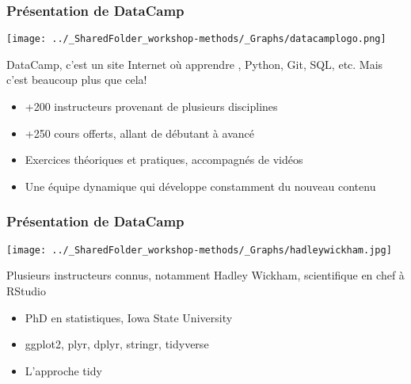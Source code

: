 \documentclass{beamer}
\begin{document}
    \begin{frame}
    
      \frametitle{Présentation de DataCamp} \vspace{1cm}
      
        \begin{center}
         \texttt{[image: ../\_SharedFolder\_workshop-methods/\_Graphs/datacamplogo.png]}
        \end{center} 
      
    DataCamp, c'est un site Internet où apprendre \R, Python, Git, SQL, etc. Mais c'est beaucoup plus que cela!
    
        \begin{itemize}
          \item{+200 instructeurs provenant de plusieurs disciplines}
          \item{+250 cours offerts, allant de débutant à avancé}
          \item{Exercices théoriques et pratiques, accompagnés de vidéos}
          \item{Une équipe dynamique qui développe constamment du nouveau contenu}
        \end{itemize}
          
    \end{frame}
    




    \begin{frame}
    
      \frametitle{Présentation de DataCamp} \vspace{1cm}
      
        \begin{center}
        
         \texttt{[image: ../\_SharedFolder\_workshop-methods/\_Graphs/hadleywickham.jpg]}
         
        \end{center} 
      
      Plusieurs instructeurs connus, notamment Hadley Wickham, scientifique en chef à RStudio
      
          \begin{itemize}
            \item{PhD en statistiques, Iowa State University}
            \item{ggplot2, plyr, dplyr, stringr, tidyverse}
            \item{L'approche tidy}
          \end{itemize}
    
    \end{frame}
    
\end{document}
